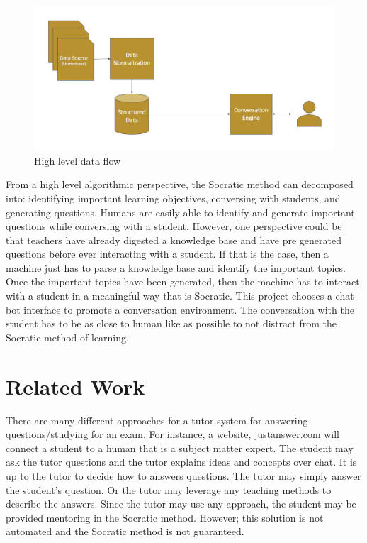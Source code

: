 \documentclass{sigchi}
\begin{document}
  \begin{figure}[!t]
  \centering
  \includegraphics[width=6.0in]{high-level}
  \caption{High level data flow}
  \label{high-level}
  \end{figure}

  From a high level algorithmic perspective, the Socratic method can decomposed into: identifying important learning objectives, conversing with students, and generating questions. Humans are easily able to identify and generate important questions while conversing with a student. However, one perspective could be that teachers have already digested a knowledge base and have pre generated questions before ever interacting with a student. If that is the case, then a machine just has to parse a knowledge base and identify the important topics. Once the important topics have been generated, then the machine has to interact with a student in a meaningful way that is Socratic. This project chooses a chat-bot interface to promote a conversation environment. The conversation with the student has to be as close to human like as possible to not distract from the Socratic method of learning.

  \section{Related Work}

  There are many different approaches for a tutor system for answering questions/studying for an exam. For instance, a website, justanswer.com will connect a student to a human that is a subject matter expert. The student may ask the tutor questions and the tutor explains ideas and concepts over chat. It is up to the tutor to decide how to answers questions. The tutor may simply answer the student’s question. Or the tutor may leverage any teaching methods to describe the answers. Since the tutor may use any approach, the student may be provided mentoring in the Socratic method. However; this solution is not automated and the Socratic method is not guaranteed.
\end{document}
